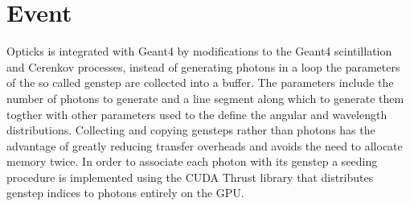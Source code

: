 \documentclass[a4paper]{jpconf}
\begin{document}
%
%
% 
% 
% 


\section{Event}

Opticks is integrated with Geant4 by modifications to the 
Geant4 scintillation and Cerenkov processes, instead of 
generating photons in a loop the parameters of the so called genstep 
are collected into a buffer. 
The parameters include the number of photons to generate and a line segment 
along which to generate them togther with other parameters used to the 
define the angular and wavelength distributions.
%
Collecting and copying gensteps rather than photons has the
advantage of greatly reducing transfer overheads and avoids the 
need to allocate memory twice.
In order to associate each photon with its genstep a seeding 
procedure is implemented using the CUDA Thrust\cite{thrust}\cite{thrustURL} 
library that distributes genstep indices to photons entirely on the GPU.
\end{document}
